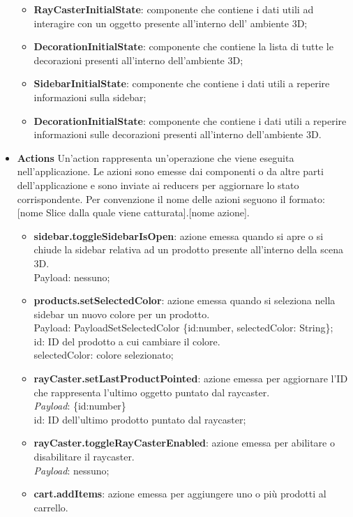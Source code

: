 \begin{itemize}
\begin{itemize}
			\item \textbf{RayCasterInitialState}: componente che contiene i dati utili ad interagire con un oggetto presente all'interno dell'
			ambiente 3D;
			\item \textbf{DecorationInitialState}: componente che contiene la lista di tutte le decorazioni presenti all'interno dell'ambiente 3D;
			\item \textbf{SidebarInitialState}: componente che contiene i dati utili a reperire informazioni sulla sidebar;
			\item \textbf{DecorationInitialState}: componente che contiene i dati utili a reperire informazioni sulle decorazioni
			presenti all'interno dell'ambiente 3D.
		\end{itemize}
		\item \textbf{\large Actions}
		Un'action rappresenta un'operazione che viene eseguita nell'applicazione.
		Le azioni sono emesse dai componenti o da altre parti dell'applicazione e sono inviate ai reducers per aggiornare lo stato corrispondente.
		Per convenzione il nome delle azioni seguono il formato: [nome Slice dalla quale viene catturata].[nome azione].
		\begin{itemize}
			\item \textbf{sidebar.toggleSidebarIsOpen}: azione emessa quando si apre o si chiude la sidebar relativa ad un prodotto presente 
			all'interno della scena 3D.
			\\
			Payload: nessuno;
			\item \textbf{products.setSelectedColor}: azione emessa quando si seleziona nella sidebar un nuovo colore per un prodotto.
			\\
			Payload: PayloadSetSelectedColor \{id:number, selectedColor: String\};
			\\
			id: ID del prodotto a cui cambiare il colore.
			\\
			selectedColor: colore selezionato;
			\item \textbf{rayCaster.setLastProductPointed}: azione emessa per aggiornare l'ID che rappresenta l'ultimo oggetto puntato dal raycaster.
			\\
			\textit{Payload}: \{id:number\}
			\\
			id: ID dell'ultimo prodotto puntato dal raycaster;
			\item \textbf{rayCaster.toggleRayCasterEnabled}: azione emessa per abilitare o disabilitare il raycaster.
			\\
			\textit{Payload}: nessuno;
			\item \textbf{cart.addItems}: azione emessa per aggiungere uno o più prodotti al carrello.

\end{itemize}
\end{itemize}
